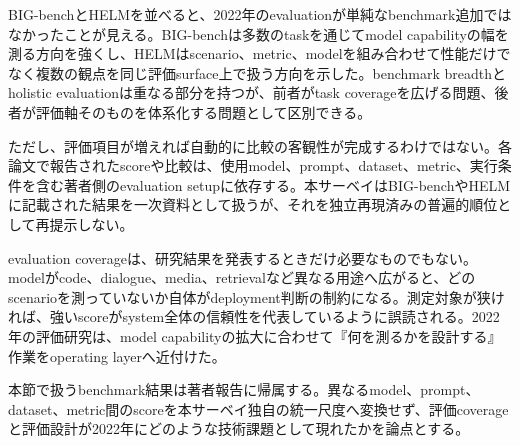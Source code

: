 
BIG-benchとHELMを並べると、2022年のevaluationが単純なbenchmark追加ではなかったことが見える。BIG-benchは多数のtaskを通じてmodel capabilityの幅を測る方向を強くし、HELMはscenario、metric、modelを組み合わせて性能だけでなく複数の観点を同じ評価surface上で扱う方向を示した。benchmark breadthとholistic evaluationは重なる部分を持つが、前者がtask coverageを広げる問題、後者が評価軸そのものを体系化する問題として区別できる。\autocite{src-1e362767e63c,src-f02969e400b0}


ただし、評価項目が増えれば自動的に比較の客観性が完成するわけではない。各論文で報告されたscoreや比較は、使用model、prompt、dataset、metric、実行条件を含む著者側のevaluation setupに依存する。本サーベイはBIG-benchやHELMに記載された結果を一次資料として扱うが、それを独立再現済みの普遍的順位として再提示しない。\autocite{src-1e362767e63c,src-f02969e400b0}


evaluation coverageは、研究結果を発表するときだけ必要なものでもない。modelがcode、dialogue、media、retrievalなど異なる用途へ広がると、どのscenarioを測っていないか自体がdeployment判断の制約になる。測定対象が狭ければ、強いscoreがsystem全体の信頼性を代表しているように誤読される。2022年の評価研究は、model capabilityの拡大に合わせて『何を測るかを設計する』作業をoperating layerへ近付けた。\autocite{src-1e362767e63c,src-f02969e400b0}


\begin{claimboundary}
本節で扱うbenchmark結果は著者報告に帰属する。異なるmodel、prompt、dataset、metric間のscoreを本サーベイ独自の統一尺度へ変換せず、評価coverageと評価設計が2022年にどのような技術課題として現れたかを論点とする。\autocite{src-1e362767e63c,src-f02969e400b0}
\end{claimboundary}
